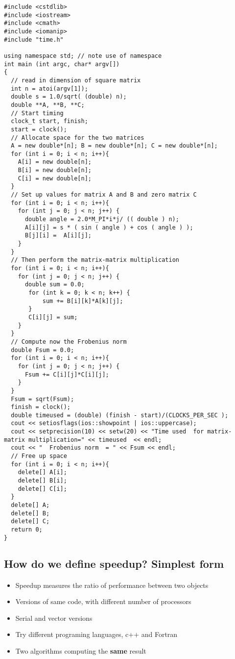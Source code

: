 \documentclass[%
oneside,                 %
final,                   %
10pt]{article}
\begin{document}
\begin{verbatim}
#include <cstdlib>
#include <iostream>
#include <cmath>
#include <iomanip>
#include "time.h"

using namespace std; // note use of namespace
int main (int argc, char* argv[])
{
  // read in dimension of square matrix
  int n = atoi(argv[1]);
  double s = 1.0/sqrt( (double) n);
  double **A, **B, **C;
  // Start timing
  clock_t start, finish;
  start = clock();
  // Allocate space for the two matrices
  A = new double*[n]; B = new double*[n]; C = new double*[n];
  for (int i = 0; i < n; i++){
    A[i] = new double[n];
    B[i] = new double[n];
    C[i] = new double[n];
  }
  // Set up values for matrix A and B and zero matrix C
  for (int i = 0; i < n; i++){
    for (int j = 0; j < n; j++) {
      double angle = 2.0*M_PI*i*j/ (( double ) n);
      A[i][j] = s * ( sin ( angle ) + cos ( angle ) );
      B[j][i] =  A[i][j];
    }
  }
  // Then perform the matrix-matrix multiplication
  for (int i = 0; i < n; i++){
    for (int j = 0; j < n; j++) {
      double sum = 0.0;
       for (int k = 0; k < n; k++) {
           sum += B[i][k]*A[k][j];
       }
       C[i][j] = sum;
    }
  }
  // Compute now the Frobenius norm
  double Fsum = 0.0;
  for (int i = 0; i < n; i++){
    for (int j = 0; j < n; j++) {
      Fsum += C[i][j]*C[i][j];
    }
  }
  Fsum = sqrt(Fsum);
  finish = clock();
  double timeused = (double) (finish - start)/(CLOCKS_PER_SEC );
  cout << setiosflags(ios::showpoint | ios::uppercase);
  cout << setprecision(10) << setw(20) << "Time used  for matrix-matrix multiplication=" << timeused  << endl;
  cout << "  Frobenius norm  = " << Fsum << endl;
  // Free up space
  for (int i = 0; i < n; i++){
    delete[] A[i];
    delete[] B[i];
    delete[] C[i];
  }
  delete[] A;
  delete[] B;
  delete[] C;
  return 0;
}

\end{verbatim}


\subsection*{How do we define speedup? Simplest form}

\paragraph{}
\begin{itemize}
\item Speedup measures the ratio of performance between two objects

\item Versions of same code, with different number of processors

\item Serial and vector versions

\item Try different programing languages, c++ and Fortran

\item Two algorithms computing the \textbf{same} result 
\end{itemize}
\end{document}
